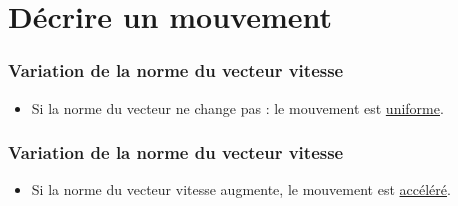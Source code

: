 \documentclass{beamer}
\begin{document}
\section{Décrire un mouvement}
\begin{frame}
	\frametitle{Variation de la norme du vecteur vitesse}
	\begin{minipage}{.5\textwidth}
		\begin{itemize}
			\item Si la norme du vecteur ne change pas : le mouvement est \underline{uniforme}.
		\end{itemize}
	\end{minipage}
	\begin{minipage}{.48\textwidth}
	\end{minipage}
\end{frame}

\begin{frame}
	\frametitle{Variation de la norme du vecteur vitesse}
	\begin{minipage}{.5\textwidth}
		\begin{itemize}
			\item Si la norme du vecteur vitesse augmente, le mouvement est \underline{accéléré}.
		\end{itemize}
	\end{minipage}
	\begin{minipage}{.48\textwidth}
	\end{minipage}
\end{frame}
\end{document}
